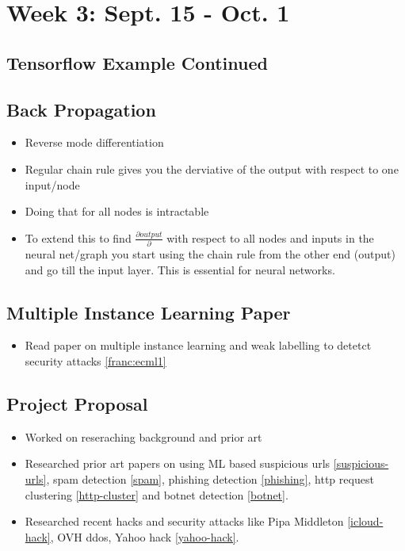 \chapter{Week 3: Sept. 15 - Oct. 1}
\label{week:3}
\section{Tensorflow Example Continued}


\section{Back Propagation}
\begin{itemize}
	\item Reverse mode differentiation
	\item Regular chain rule gives you the derviative of the output with respect to one input/node
	\item Doing that for all nodes is intractable
	\item To extend this to find $\frac{\partial output}{\partial}$ with respect to all nodes and inputs in the neural net/graph you start using the chain rule from the other end (output) and go till the input layer. This is essential for neural networks. \cite{backprop}
\end{itemize}

\section{Multiple Instance Learning Paper}
\begin{itemize}
	\item Read paper on multiple instance learning and weak labelling to detetct security attacks \ref{franc:ecml1}
\end{itemize}



\section{Project Proposal}
\begin{itemize}
	\item Worked on reseraching background and prior art
	\item Researched prior art papers on using ML based suspicious urls \ref{suspicious-urls}, spam detection \ref{spam}, phishing detection \ref{phishing}, http request clustering \ref{http-cluster} and botnet detection \ref{botnet}.
	\item Researched recent hacks and security attacks like Pipa Middleton \ref{icloud-hack}, OVH ddos, Yahoo hack \ref{yahoo-hack}.
\end{itemize}